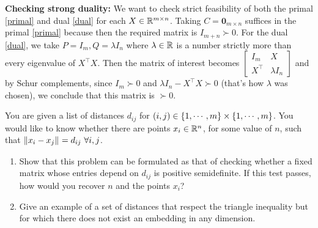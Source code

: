 \begin{enumerate}[leftmargin=*]
\textbf{Checking strong duality:} We want to check strict feasibility of both the primal \ref{primal} and dual \ref{dual} for each $X\in\mathbb{R}^{m\times n}$. Taking $C=\pmb 0_{m\times n}$ suffices in the primal \ref{primal} because then the required matrix is $I_{m+n}\succ 0$. For the dual \ref{dual}, we take $P=I_{m}, Q=\lambda I_{n}$ where $\lambda\in \mathbb{R}$ is a number strictly more than every eigenvalue of $X^{\top}X$. Then the matrix of interest becomes $\begin{bmatrix} I_{m}&X\\X^{\top}&\lambda I_{n}\end{bmatrix}$ and by Schur complements, since $I_{m}\succ 0$ and $\lambda I_{n} - X^{\top}X \succ 0$ (that's how $\lambda$ was chosen), we conclude that this matrix is $\succ 0$.




\end{enumerate}


\newpage

\pb

You are given a list of distances $d_{ij}$ for $(i,j) \in\left\{1,\cdots,m\right\} \times \left\{1,\cdots,m\right\}$. You would like to know whether there are points $x_{i} \in \mathbb{R}^{n}$, for some value of $n$, such that $\displaystyle \left\lVert x_{i}-x_{j} \right\rVert_{} = d_{ij}~\forall i,j$.
\begin{enumerate}[leftmargin=*]
\item Show that this problem can be formulated as that of checking whether a fixed matrix whose entries depend on $d_{ij}$ is positive semidefinite. If this test passes, how would you recover $n$ and the points $x_{i}$?
\item Give an example of a set of distances that respect the triangle inequality but for which there does not exist an embedding in any dimension.
\end{enumerate}

